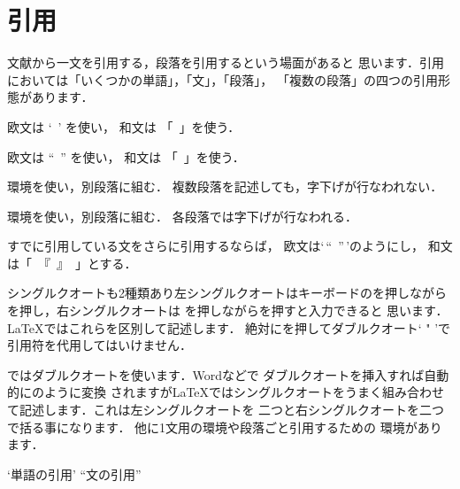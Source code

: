 \section{引用}

文献から一文を引用する，段落を引用するという場面があると
思います．引用においては「いくつかの単語」，「文」，「段落」，
「複数の段落」の四つの引用形態があります．
\begin{description}
 \item[単語の引用]
   欧文は `~' を使い，
   和文は 「~」を使う．

 \item[文の引用]  
   欧文は ``~'' を使い，
   和文は 「~」を使う．

 \item[段落の引用]  
   環境を使い，別段落に組む．
   複数段落を記述しても，字下げが行なわれない．

 \item[複数段落の引用]  
   環境を使い，別段落に組む．
   各段落では字下げが行なわれる．
 \item[引用の引用]
   すでに引用している文をさらに引用するならば，
  欧文は`\,``~''\,'のようにし，
  和文は「~『~』~」とする．
\end{description}

シングルクオートも2種類あり左シングルクオートはキーボードのを押しながら
を押し，右シングルクオートは
を押しながらを押すと入力できると
思います．{\LaTeX}ではこれらを区別して記述します．
絶対にを押して{ダブルクオート` \str" 'で%
引用符を代用してはいけません}．

%
ではダブルクオートを使います．{Word}などで
ダブルクオートを挿入すれば自動的にのように変換
されますが{\LaTeX}ではシングルクオートをうまく組み合わせ
て記述します．これは左シングルクオートを
二つと右シングルクオートを二つで括る事になります．
他に1文用の環境や段落ごと引用するための
環境があります．

\begin{usage}
`単語の引用'
``文の引用''
\end{usage}

